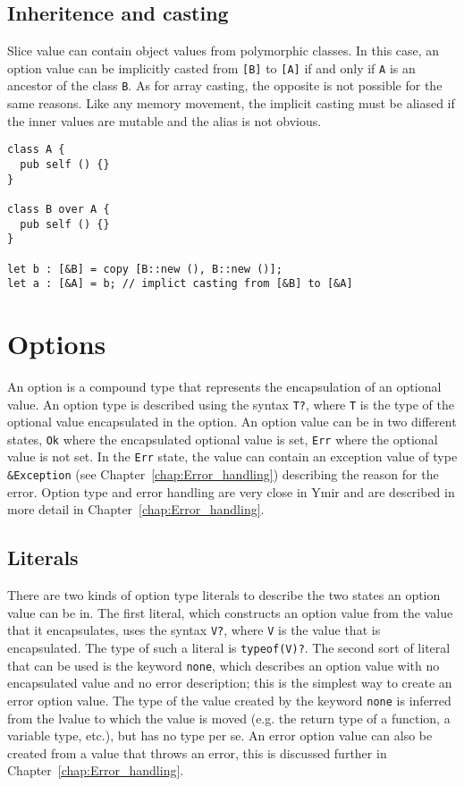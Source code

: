 \subsection{Inheritence and casting}

Slice value can contain object values from polymorphic classes. In this case, an
option value can be implicitly casted from \texttt{[B]} to \texttt{[A]} if and
only if \texttt{A} is an ancestor of the class \texttt{B}. As for array casting,
the opposite is not possible for the same reasons. Like any memory movement, the
implicit casting must be aliased if the inner values are mutable and the alias
is not obvious.

\begin{lstlisting}[style=coloredverbatim]
class A {
  pub self () {}
}

class B over A {
  pub self () {}
}

let b : [&B] = copy [B::new (), B::new ()];
let a : [&A] = b; // implict casting from [&B] to [&A]
\end{lstlisting}

\section{Options}%
\label{sec:options}

An option is a compound type that represents the encapsulation of an optional
value. An option type is described using the syntax \texttt{T?}, where
\texttt{T} is the type of the optional value encapsulated in the option. An
option value can be in two different states, \texttt{Ok} where the encapsulated
optional value is set, \texttt{Err} where the optional value is not set. In the
\texttt{Err} state, the value can contain an exception value of type
\texttt{\&Exception} (see Chapter~\ref{chap:Error_handling}) describing the
reason for the error. Option type and error handling are very close in Ymir and
are described in more detail in Chapter~\ref{chap:Error_handling}.

\subsection{Literals}

There are two kinds of option type literals to describe the two states an option
value can be in. The first literal, which constructs an option value from the
value that it encapsulates, uses the syntax \texttt{V?}, where \texttt{V} is the
value that is encapsulated. The type of such a literal is \texttt{typeof(V)?}.
The second sort of literal that can be used is the keyword \texttt{none}, which
describes an option value with no encapsulated value and no error description;
this is the simplest way to create an error option value. The type of the value
created by the keyword \texttt{none} is inferred from the lvalue to which the
value is moved (e.g. the return type of a function, a variable type, etc.), but
has no type per se. An error option value can also be created from a value that
throws an error, this is discussed further in Chapter~\ref{chap:Error_handling}.


